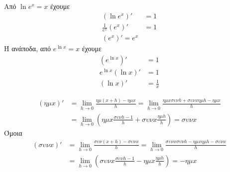 \documentclass{presentation}
\begin{document}
\begin{apodiksi}
  Από $\ln e^x=x$ έχουμε
  \begin{align*}
    \left( \ln e^x \right)'          & =1 \\
    \frac{1}{e^x}\left( e^x \right)' & =1 \\
    \left( e^x \right)' = e^x
  \end{align*}
  Ή ανάποδα, από $e^{\ln x}=x$ έχουμε
  \begin{align*}
    \left( e^{\ln x} \right)'      & =1           \\
    e^{\ln x}\left( \ln x \right)' & =1           \\
    \left( \ln x \right)'          & =\frac{1}{x}
  \end{align*}
  \hyperlink{Θεωρία}{}
\end{apodiksi}

\begin{apodiksi}[$(ημx)'=συνx$ και $(συνx)'=-ημx$]
  \begin{align*}
    (ημ x)' & =\lim\limits_{h \to 0}{ \frac{ημ (x+h) - ημ x}{h}}=\lim\limits_{h \to 0}{ \frac{ημ x συν h + συν x ημ h - ημx}{h}} \\
            & =\lim\limits_{h \to 0}{ \left( ημx\frac{συνh-1}{h}+συνx\frac{ημh}{h} \right) }=συνx
  \end{align*}
  Όμοια
  \begin{align*}
    (συν x)' & =\lim\limits_{h \to 0}{ \frac{συν (x+h) - συν x}{h}}=\lim\limits_{h \to 0}{ \frac{συν x συν h - ημ x ημ h - συνx}{h}} \\
             & =\lim\limits_{h \to 0}{ \left( συνx\frac{συνh-1}{h}-ημx\frac{ημh}{h} \right) }=-ημx
  \end{align*}
  \hyperlink{Θεωρία}{}
\end{apodiksi}

\moodle
\end{document}
